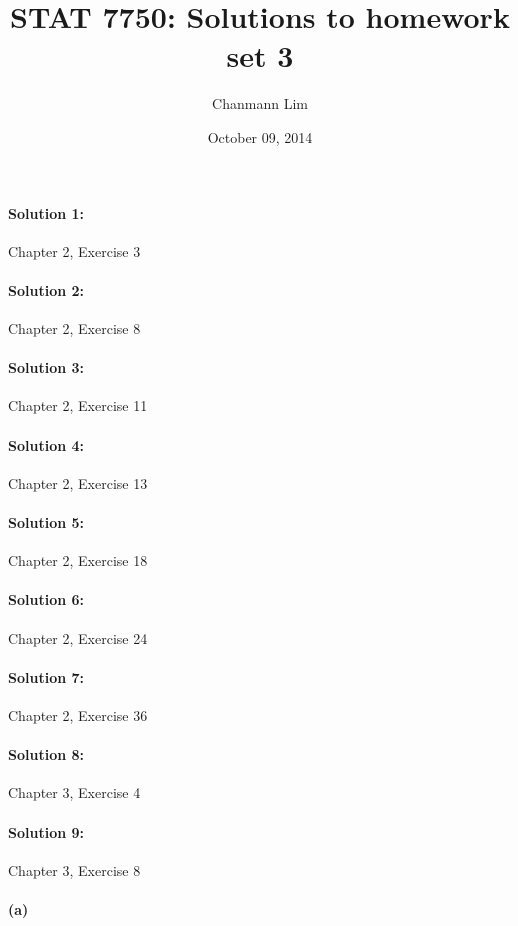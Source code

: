 \documentclass[a4paper]{article}
\begin{document}
\title{STAT 7750: Solutions to homework set 3}
\author{Chanmann Lim}
\date{October 09, 2014}
\maketitle

\paragraph{Solution 1:}
Chapter 2, Exercise 3

\paragraph{Solution 2:}
Chapter 2, Exercise 8

\paragraph{Solution 3:}
Chapter 2, Exercise 11

\paragraph{Solution 4:}
Chapter 2, Exercise 13

\paragraph{Solution 5:}
Chapter 2, Exercise 18

\paragraph{Solution 6:}
Chapter 2, Exercise 24

\paragraph{Solution 7:}
Chapter 2, Exercise 36

\paragraph{Solution 8:}
Chapter 3, Exercise 4

\paragraph{Solution 9:}
Chapter 3, Exercise 8

\paragraph{(a)}
\end{document}
